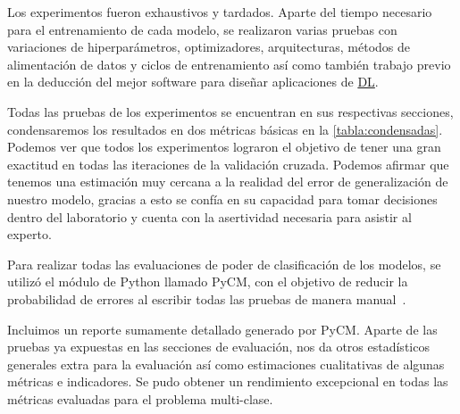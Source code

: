 Los experimentos fueron exhaustivos y tardados. Aparte del tiempo necesario para
el entrenamiento de cada modelo, se realizaron varias pruebas con variaciones de
hiperparámetros, optimizadores, arquitecturas, métodos de alimentación de datos
y ciclos de entrenamiento así como también trabajo previo en la deducción del
mejor software para diseñar aplicaciones de \hyperlink{abbr}{DL}.

Todas las pruebas de los experimentos se encuentran en sus respectivas
secciones, condensaremos los resultados en dos métricas básicas en la
\autoref{tabla:condensadas}. Podemos ver que todos los experimentos lograron el
objetivo de tener una gran exactitud en todas las iteraciones de la validación
cruzada. Podemos afirmar que tenemos una estimación muy cercana a la realidad
del error de generalización de nuestro modelo, gracias a esto se confía en su
capacidad para tomar decisiones dentro del laboratorio y cuenta con la
asertividad necesaria para asistir al experto.

\begin{table}[H]
    \centering
    \caption{Métricas condensadas de los experimentos}\label{tabla:condensadas}
\end{table}

Para realizar todas las evaluaciones de poder de clasificación de los modelos,
se utilizó el módulo de Python llamado PyCM, con el objetivo de
reducir la probabilidad de errores al escribir todas las pruebas de manera
manual~\cite{Haghighi2018}.

Incluimos un reporte sumamente detallado generado por PyCM. Aparte de las
pruebas ya expuestas en las secciones de evaluación, nos da otros estadísticos
generales extra para la evaluación así como estimaciones cualitativas de algunas
métricas e indicadores. Se pudo obtener un rendimiento excepcional en todas las
métricas evaluadas para el problema multi-clase. 



